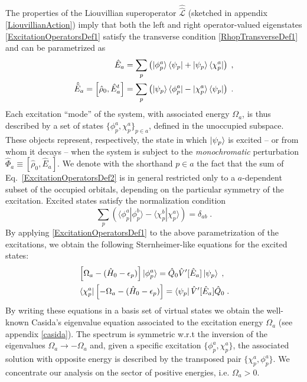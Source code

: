 \documentclass[reprint,aps,prb]{revtex4-1}
\newcommand{\eps}{\epsilon}
\newcommand{\be}{\begin{equation}}
\newcommand{\ee}{\end{equation}}
\newcommand{\nn}{\notag}
\newcommand{\lb}{\label}
\newcommand{\op}[1]{\hat {#1}}
\newcommand{\sop}[1]{\op{\op {#1}}}
\newcommand{\commutator}[2]{\left[ {#1} , {#2} \right]}
\newcommand{\brket}[2]{\langle  #1 | #2 \rangle} %
\newcommand{\dmnot}{\op{\rho}_0}
\newcommand{\hnot}{\op{H}_0}
\newcommand{\Liouv}{\sop{\mathcal L}}
\begin{document}
The properties of the Liouvillian superoperator $\Liouv$ (sketched in appendix \ref{LiouvillianAction}) imply that both the left and right operator-valued
eigenstates \eqref{ExcitationOperatorsDef1} satisfy the transverse condition \eqref{RhopTransverseDef1} and can be parametrized as
\begin{align}\lb{ExcitationOperatorsDef2}
\op E_a &= \sum_p \left( \ket{\phi^a_p}\bra{\psi_p} + \ket{\psi_p} \bra{\chi^a_p}\right)\;, \nn \\
\op{\tilde E}_a = \commutator{\dmnot}{\op E^t_a} &= \sum_p \left( \ket{\psi_p}\bra{\phi^a_p} - \ket{\chi^a_p} \bra{\psi_p}\right)\;.
\end{align}
Each excitation ``mode'' of the system, with associated energy $\Omega_a$, is thus described by a set of states $\{\phi^a_p,\chi^a_p\}_{p \in a}$, defined in the unoccupied subspace. These objects represent, respectively, the state in which $\ket{\psi_p}$ is excited -- or from whom it decays -- when the system is subject to the \emph{monochromatic} perturbation $\op \Phi_a \equiv \commutator{\dmnot}{\op E_a}$. We denote with the shorthand $p \in a$ the fact that the sum of Eq.~\eqref{ExcitationOperatorsDef2} is in general restricted only to a $a$-dependent subset of the occupied orbitals, depending on the particular symmetry
of the excitation. Excited states  satisfy the normalization condition
\be\lb{ExcitedStateOrthNormDef1}
\sum_p \left(\brket{\phi_p^a}{\phi_p^b} - \brket{\chi_p^b}{\chi_p^a}\right) = \delta_{ab} \;.
\ee
By applying \eqref{ExcitationOperatorsDef1} to the above parametrization
of the excitations, we obtain the following Sternheimer-like equations for the excited states:
\begin{align}\lb{ExcitationOperatorsDef3}
&\left[\Omega_a-(\hnot - \eps_p)\right] \ket{\phi_p^a} = \op Q_0 \op V'[\op E_a] \ket{\psi_p} \;, \nn\\
&\bra{\chi_p^a}\left[-\Omega_a-(\hnot - \eps_p)\right] = \bra{\psi_p} \op V'[\op E_a] \op Q_0  \;.
\end{align}
By writing these equations in a basis set of virtual states we obtain the well-known Casida's eigenvalue equation\cite{CasidaBook}
associated to the excitation energy $\Omega_a$ (see appendix \ref{casida}).
The spectrum is symmetric w.r.t the inversion of the eigenvalues $\Omega_a \rightarrow -\Omega_a$ and, given a specific excitation $\{\phi^a_p,\chi^a_p\}$, 
the associated solution with opposite energy is described by the transposed pair $\{\chi^a_p,\phi^a_p\}$.
We concentrate our analysis on the sector of positive energies, i.e. $\Omega_a > 0$.
\end{document}

